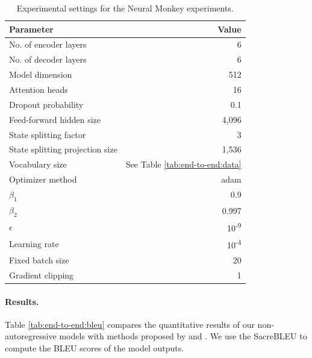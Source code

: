 \begin{table}
  \centering
  \begin{tabular}{lr}
    \toprule
    Parameter & Value \\
    \midrule
    No. of encoder layers & 6 \\
    No. of decoder layers & 6 \\
    Model dimension & 512 \\
    Attention heads & 16 \\
    Dropout probability & 0.1 \\
    Feed-forward hidden size & 4,096 \\
    State splitting factor & 3 \\
    State splitting projection size & 1,536 \\
    Vocabulary size & See Table \ref{tab:end-to-end:data} \\
    \midrule
    Optimizer method & adam \\
    $\beta_1$ & 0.9 \\
    $\beta_2$ & 0.997 \\
    $\epsilon$ & 10\textsuperscript{-9} \\
    Learning rate & 10\textsuperscript{-4} \\
    Fixed batch size & 20 \\
    Gradient clipping & 1 \\
    \bottomrule
  \end{tabular}

  \caption{Experimental settings for the Neural Monkey experiments.}%
  \label{tab:end-to-end:hparams}
\end{table}

\paragraph{Results.} Table \ref{tab:end-to-end:bleu} compares the quantitative
results of our non-autoregressive models with methods proposed by
\citet{gu2017nonautoregressive} and \citet{lee-etal-2018-deterministic}. We use
the SacreBLEU \citep{post-2018-call} to compute the BLEU scores of the model
outputs.


